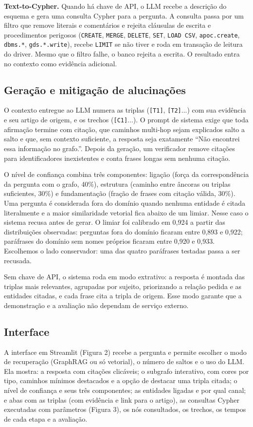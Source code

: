 \documentclass[12pt]{article}
\begin{document}
\textbf{Text-to-Cypher.} Quando há chave de API, o LLM recebe a descrição do esquema e gera uma consulta Cypher para a pergunta. A consulta passa por um filtro que remove literais e comentários e rejeita cláusulas de escrita e procedimentos perigosos (\texttt{CREATE}, \texttt{MERGE}, \texttt{DELETE}, \texttt{SET}, \texttt{LOAD CSV}, \texttt{apoc.create}, \texttt{dbms.*}, \texttt{gds.*.write}), recebe \texttt{LIMIT} se não tiver e roda em transação de leitura do driver. Mesmo que o filtro falhe, o banco rejeita a escrita. O resultado entra no contexto como evidência adicional.

\subsection{Geração e mitigação de alucinações}
O contexto entregue ao LLM numera as triplas (\texttt{[T1]}, \texttt{[T2]}...) com sua evidência e seu artigo de origem, e os trechos (\texttt{[C1]}...). O prompt de sistema exige que toda afirmação termine com citação, que caminhos multi-hop sejam explicados salto a salto e que, sem contexto suficiente, a resposta seja exatamente ``Não encontrei essa informação no grafo.''. Depois da geração, um verificador remove citações para identificadores inexistentes e conta frases longas sem nenhuma citação.

O nível de confiança combina três componentes: ligação (força da correspondência da pergunta com o grafo, 40\%), estrutura (caminho entre âncoras ou triplas suficientes, 30\%) e fundamentação (fração de frases com citação válida, 30\%). Uma pergunta é considerada fora do domínio quando nenhuma entidade é citada literalmente e a maior similaridade vetorial fica abaixo de um limiar. Nesse caso o sistema recusa antes de gerar. O limiar foi calibrado em 0,924 a partir das distribuições observadas: perguntas fora do domínio ficaram entre 0,893 e 0,922; paráfrases do domínio sem nomes próprios ficaram entre 0,920 e 0,933. Escolhemos o lado conservador: uma das quatro paráfrases testadas passa a ser recusada.

Sem chave de API, o sistema roda em modo extrativo: a resposta é montada das triplas mais relevantes, agrupadas por sujeito, priorizando a relação pedida e as entidades citadas, e cada frase cita a tripla de origem. Esse modo garante que a demonstração e a avaliação não dependam de serviço externo.

\subsection{Interface}
A interface em Streamlit (Figura 2) recebe a pergunta e permite escolher o modo de recuperação (GraphRAG ou só vetorial), o número de saltos e o uso do LLM. Ela mostra: a resposta com citações clicáveis; o subgrafo interativo, com cores por tipo, caminhos mínimos destacados e a opção de destacar uma tripla citada; o nível de confiança e seus três componentes; as entidades ligadas e por qual canal; e abas com as triplas (com evidência e link para o artigo), as consultas Cypher executadas com parâmetros (Figura 3), os nós consultados, os trechos, os tempos de cada etapa e a avaliação.
\end{document}
